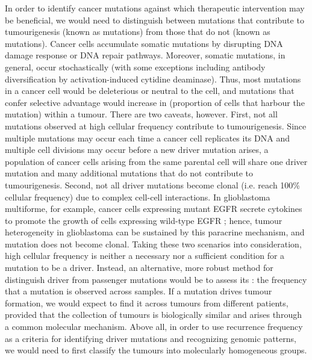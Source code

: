 In order to identify cancer mutations against which therapeutic intervention may be beneficial, we would need to distinguish between mutations that contribute to tumourigenesis (known as  mutations) from those that do not (known as  mutations). Cancer cells accumulate somatic mutations by disrupting DNA damage response or DNA repair pathways. Moreover, somatic mutations, in general, occur stochastically (with some exceptions including antibody diversification by activation-induced cytidine deaminase). Thus, most mutations in a cancer cell would be deleterious or neutral to the cell, and mutations that confer selective advantage would increase in  (proportion of cells that harbour the mutation) within a tumour. There are two caveats, however. First, not all mutations observed at high cellular frequency contribute to tumourigenesis. Since multiple mutations may occur each time a cancer cell replicates its DNA and multiple cell divisions may occur before a new driver mutation arises, a population of cancer cells arising from the same parental cell will share one driver mutation and many additional mutations that do not contribute to tumourigenesis. Second, not all driver mutations become clonal (i.e. reach 100\% cellular frequency) due to complex cell-cell interactions. In glioblastoma multiforme, for example, cancer cells expressing mutant EGFR secrete cytokines to promote the growth of cells expressing wild-type EGFR ; hence, tumour heterogeneity in glioblastoma can be sustained by this paracrine mechanism, and  mutation does not become clonal. Taking these two scenarios into consideration, high cellular frequency is neither a necessary nor a sufficient condition for a mutation to be a driver. Instead, an alternative, more robust method for distinguish driver from passenger mutations would be to assess its : the frequency that a mutation is observed across samples. If a mutation drives tumour formation, we would expect to find it across tumours from different patients, provided that the collection of tumours is biologically similar and arises through a common molecular mechanism. Above all, in order to use recurrence frequency as a criteria for identifying driver mutations and recognizing genomic patterns, we would need to first classify the tumours into molecularly homogeneous groups.

